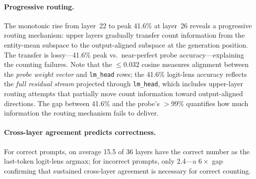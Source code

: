 \documentclass{article}
\begin{document}
\paragraph{Progressive routing.}
The monotonic rise from layer~22 to peak 41.6\% at layer~26 reveals a progressive routing mechanism:
upper layers gradually transfer count information from the entity-mean subspace to the
output-aligned subspace at the generation position.
The transfer is lossy---41.6\% peak vs.\ near-perfect probe accuracy---explaining the
counting failures.
Note that the $\leq 0.032$ cosine measures alignment between the \emph{probe weight vector}
and \texttt{lm\_head} rows; the 41.6\% logit-lens accuracy reflects the \emph{full residual
stream} projected through \texttt{lm\_head}, which includes upper-layer routing attempts that
partially move count information toward output-aligned directions.
The gap between 41.6\% and the probe's $>$99\% quantifies how much information the
routing mechanism fails to deliver.

\paragraph{Cross-layer agreement predicts correctness.}
For correct prompts, on average 15.5 of 36 layers have the correct number as the last-token logit-lens argmax; for incorrect prompts, only 2.4---a $6\times$ gap confirming that sustained cross-layer agreement is necessary for correct counting.
\end{document}
